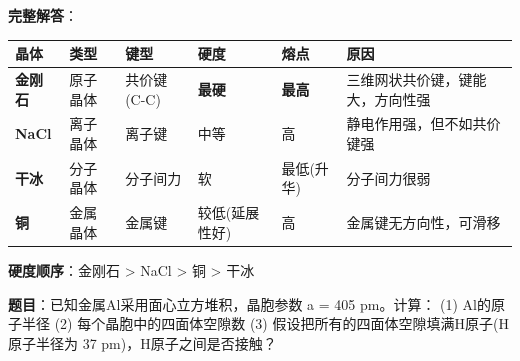 \documentclass[a4paper,11pt]{ctexart}
\newcounter{none}
\newcommand{\箭}{\ensuremath{\rightarrow}}
\newcommand{\左箭}{\ensuremath{\leftarrow}}
\newcommand{\上箭}{\ensuremath{\uparrow}}
\newcommand{\下箭}{\ensuremath{\downarrow}}
\newcommand{\衡}{\ensuremath{\rightleftharpoons}}
\newcommand{\双箭}{\ensuremath{\leftrightarrow}}
\newcommand{\约等于}{\ensuremath{\approx}}
\newcommand{\小于等于}{\ensuremath{\leq}}
\newcommand{\大于等于}{\ensuremath{\geq}}
\newcommand{\不等于}{\ensuremath{\neq}}
\newcommand{\西格马}{\ensuremath{\sigma}}
\newcommand{\派}{\ensuremath{\pi}}
\begin{document}
\textbf{完整解答}：

{\def\LTcaptype{none} %
\begin{longtable}[]{@{}
  >{\raggedright\arraybackslash}p{}
  >{\raggedright\arraybackslash}p{}
  >{\raggedright\arraybackslash}p{}
  >{\centering\arraybackslash}p{}
  >{\centering\arraybackslash}p{}
  >{\raggedright\arraybackslash}p{}@{}}
\toprule\noalign{}
\begin{minipage}[b]{\linewidth}\raggedright
晶体
\end{minipage} & \begin{minipage}[b]{\linewidth}\raggedright
类型
\end{minipage} & \begin{minipage}[b]{\linewidth}\raggedright
键型
\end{minipage} & \begin{minipage}[b]{\linewidth}\centering
硬度
\end{minipage} & \begin{minipage}[b]{\linewidth}\centering
熔点
\end{minipage} & \begin{minipage}[b]{\linewidth}\raggedright
原因
\end{minipage} \\
\midrule\noalign{}
\endhead
\bottomrule\noalign{}
\endlastfoot
\textbf{金刚石} & 原子晶体 & 共价键(C-C) & \textbf{最硬} & \textbf{最高} & 三维网状共价键，键能大，方向性强 \\
\textbf{NaCl} & 离子晶体 & 离子键 & 中等 & 高 & 静电作用强，但不如共价键强 \\
\textbf{干冰} & 分子晶体 & 分子间力 & 软 & 最低(升华) & 分子间力很弱 \\
\textbf{铜} & 金属晶体 & 金属键 & 较低(延展性好) & 高 & 金属键无方向性，可滑移 \\
\end{longtable}
}

\textbf{硬度顺序}：金刚石 \textgreater{} NaCl \textgreater{} 铜 \textgreater{} 干冰

\textbf{题目}：已知金属Al采用面心立方堆积，晶胞参数 a = 405 pm。计算：
(1) Al的原子半径
(2) 每个晶胞中的四面体空隙数
(3) 假设把所有的四面体空隙填满H原子(H原子半径为 37 pm)，H原子之间是否接触？
\end{document}

